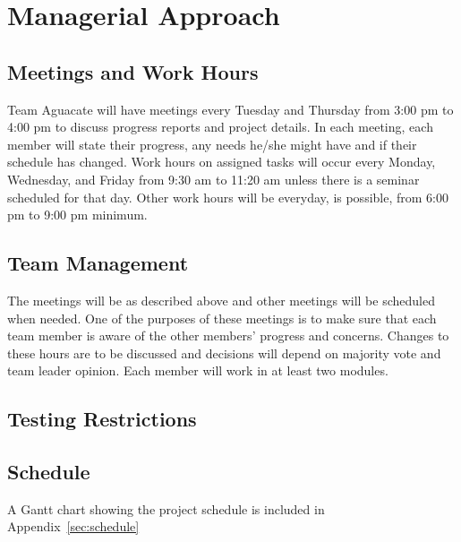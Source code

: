 \section{Managerial Approach}

\subsection{Meetings and Work Hours}
Team Aguacate will have meetings every Tuesday and Thursday from 3:00 pm to 4:00 pm to discuss progress reports and project details.  In each meeting, each member will state their progress, any needs he/she might have and if their schedule has changed.  Work hours on assigned tasks will occur every Monday, Wednesday, and Friday from 9:30 am to 11:20 am unless there is a seminar scheduled for that day.  Other work hours will be everyday, is possible, from 6:00 pm to 9:00 pm minimum.

\subsection{Team Management}
The meetings will be as described above and other meetings will be scheduled when needed.  One of the purposes of these meetings is to make sure that each team member is aware of the other members' progress and concerns.  Changes to these hours are to be discussed and decisions will depend on majority vote and team leader opinion.  Each member will work in at least two modules.

\subsection{Testing Restrictions}

\subsection{Schedule}
A Gantt chart showing the project schedule is included in Appendix~\ref{sec:schedule} 